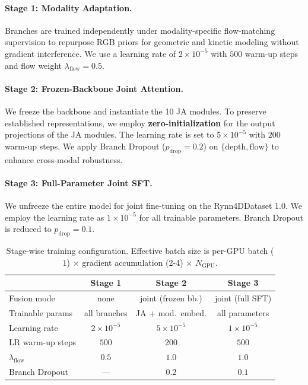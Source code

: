 \paragraph{Stage 1: Modality Adaptation.}
Branches are trained independently under modality-specific flow-matching supervision to repurpose RGB priors for geometric and kinetic modeling without gradient interference. We use a learning rate of $2{\times}10^{-5}$ with $500$ warm-up steps and flow weight $\lambda_{\text{flow}}{=}0.5$.

\paragraph{Stage 2: Frozen-Backbone Joint Attention.}
We freeze the backbone and instantiate the 10 JA modules. To preserve established representations, we employ \textbf{zero-initialization} for the output projections of the JA modules. The learning rate is set to $5{\times}10^{-5}$ with $200$ warm-up steps. We apply Branch Dropout ($p_{\text{drop}}{=}0.2$) on $\{\text{depth}, \text{flow}\}$ to enhance cross-modal robustness.

\paragraph{Stage 3: Full-Parameter Joint SFT.}
We unfreeze the entire model for joint fine-tuning on the Rynn4DDataset 1.0.
We employ the learning rate as $1{\times}10^{-5}$ for all trainable parameters. Branch Dropout is reduced to $p_{\text{drop}}{=}0.1$.

\begin{table}[t]
\centering
\caption{Stage-wise training configuration. Effective batch size is per-GPU batch ($1$) $\times$ gradient accumulation (2-4) $\times$ $N_{\text{GPU}}$.}
\label{tab:training_hparams}
\setlength{\tabcolsep}{5pt}
\begin{tabular}{lccc}
\toprule
 & \textbf{Stage 1} & \textbf{Stage 2} & \textbf{Stage 3} \\
\midrule
\rowcolor{gray!10}Fusion mode & none & joint (frozen bb.) & joint (full SFT) \\
Trainable params & all branches & JA + mod.\ embed. & all parameters \\
\rowcolor{gray!10}Learning rate & $2{\times}10^{-5}$ & $5{\times}10^{-5}$ & $1{\times}10^{-5}$ \\
LR warm-up steps & $500$ & $200$ & $500$ \\
\rowcolor{gray!10}$\lambda_{\text{flow}}$ & $0.5$ & $1.0$ & $1.0$ \\
Branch Dropout & --- & $0.2$ & $0.1$ \\
\bottomrule
\end{tabular}
\end{table}

